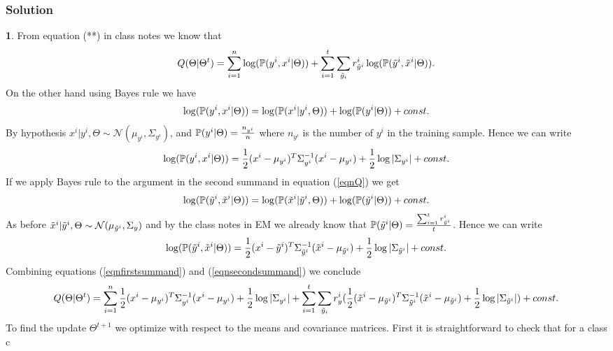 \documentclass{article}
\begin{document}
\subsubsection*{Solution}
\textbf{1}. From equation (**) in class notes we know that 
\begin{equation}\label{eqnQ}
Q(\Theta|\Theta^{t})=\sum_{i=1}^{n}\log(\mathbb{P}(y^{i},x^{i}|\Theta))+\sum_{i=1}^{t}\sum_{\tilde{y}_{i}}r^{i}_{\tilde{y}^{i}}\log(\mathbb{P}(\tilde{y}^{i},\tilde{x}^{i}|\Theta)).
\end{equation}
On the other hand using Bayes rule we have
\begin{equation*}
\log(\mathbb{P}(y^{i},x^{i}|\Theta))=\log(\mathbb{P}(x^{i}|y^{i},\Theta))+\log(\mathbb{P}(y^{i}|\Theta))+const.
\end{equation*}
By hypothesis $x^{i}|y^{i},\Theta\sim\mathcal{N}(\mu_{y^{i}},\Sigma_{y^{i}})$, and $\mathbb{P}(y^{i}|\Theta)=\frac{n_{y^{i}}}{n}$ where $n_{y^{i}}$ is the number of $y^{i}$ in the training sample. Hence we can write
\begin{equation}\label{eqnfirstsummand}
\log(\mathbb{P}(y^{i},x^{i}|\Theta))=\frac{1}{2}(x^{i}-\mu_{y^{i}})^{T}\Sigma_{y^{i}}^{-1}(x^{i}-\mu_{y^{i}})+\frac{1}{2}\log|\Sigma_{y^{i}}|+const.
\end{equation}
If we apply Bayes rule to the argument in the second summand in equation (\ref{eqnQ}) we get
\begin{equation*}
\log(\mathbb{P}(\tilde{y}^{i},\tilde{x}^{i}|\Theta))=\log(\mathbb{P}(\tilde{x}^{i}|\tilde{y}^{i},\Theta))+\log(\mathbb{P}(\tilde{y}^{i}|\Theta))+const.
\end{equation*}
As before $\tilde{x}^{i}|\tilde{y}^{i},\Theta\sim\mathcal{N}(\mu_{\tilde{y}^{i}},\Sigma_{\\y})$ and by the class notes in EM we already  know that $\mathbb{P}(\tilde{y}^{i}|\Theta)=\frac{\sum_{i=1}^{t}r^{i}_{\tilde{y}^{i}}}{t}$. Hence we can write
\begin{equation}\label{eqnsecondsummand}
\log(\mathbb{P}(\tilde{y}^{i},\tilde{x}^{i}|\Theta))=\frac{1}{2}(x^{i}-\tilde{y}^{i})^{T}\Sigma_{\tilde{y}^{i}}^{-1}(\tilde{x}^{i}-\mu_{\tilde{y}^{i}})+\frac{1}{2}\log|\Sigma_{\tilde{y}^{i}}|+const.
\end{equation}
Combining equations (\ref{eqnfirstsummand}) and (\ref{eqnsecondsummand}) we conclude
\begin{equation*}
Q(\Theta|\Theta^{t})=\sum_{i=1}^{n}\frac{1}{2}(x^{i}-\mu_{y^{i}})^{T}\Sigma_{y^{i}}^{-1}(x^{i}-\mu_{y^{i}})+\frac{1}{2}\log|\Sigma_{y^{i}}|+
\sum_{i=1}^{t}\sum_{\tilde{y}_{i}}r^{i}_{\\y}(\frac{1}{2}(\tilde{x}^{i}-\mu_{\tilde{y}^{i}})^{T}\Sigma_{\tilde{y}^{i}}^{-1}(\tilde{x}^{i}-\mu_{\tilde{y}^{i}})+\frac{1}{2}\log|\Sigma_{\tilde{y}^{i}}|)+const.
\end{equation*}
To find the update $\Theta^{t+1}$ we optimize with respect to the means and covariance matrices. First it is straightforward to check that for a class c
\end{document}
